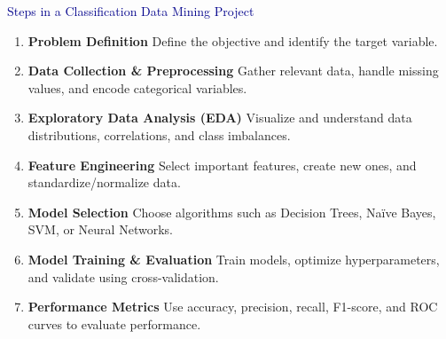 \begin{frame}{\textcolor{darkblue}{Steps in a Classification Data Mining Project}}

        \begin{enumerate}
            \item \textbf{Problem Definition}  
            \small Define the objective and identify the target variable.  

            \item \textbf{Data Collection \& Preprocessing}  
            \small Gather relevant data, handle missing values, and encode categorical variables.  

            \item \textbf{Exploratory Data Analysis (EDA)}  
            \small Visualize and understand data distributions, correlations, and class imbalances.  

            \item \textbf{Feature Engineering}  
            \small Select important features, create new ones, and standardize/normalize data.  

            \item \textbf{Model Selection}  
            \small Choose algorithms such as Decision Trees, Naïve Bayes, SVM, or Neural Networks.  

            \item \textbf{Model Training \& Evaluation}  
            \small Train models, optimize hyperparameters, and validate using cross-validation.  

            \item \textbf{Performance Metrics}  
            \small Use accuracy, precision, recall, F1-score, and ROC curves to evaluate performance.  

        \end{enumerate}


\end{frame}








